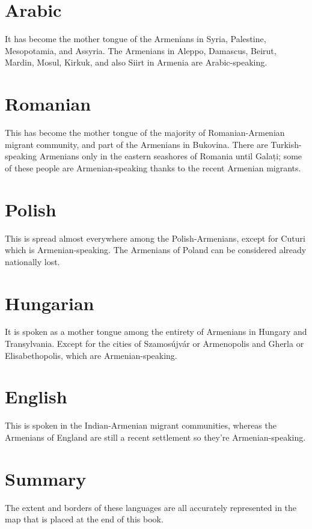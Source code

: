 \section{Arabic}\label{sec:Langauges:Arabic}

It has become the mother tongue of the Armenians in Syria, Palestine, Mesopotamia, and Assyria. The Armenians in Aleppo, Damascus, Beirut, Mardin, Mosul, Kirkuk, and also Siirt in Armenia are Arabic-speaking. 

\section{Romanian}

This has become the mother tongue of the majority of Romanian-Armenian migrant community, and part of the Armenians in Bukovina. There are Turkish-speaking Armenians only in the eastern seashores of Romania until Galați; some of these people are Armenian-speaking thanks to the recent Armenian migrants. 

\section{Polish}

This is spread almost everywhere among the Polish-Armenians, except for Cuturi which is Armenian-speaking. The Armenians of Poland can be considered already nationally lost.

\section{Hungarian}

It is spoken as a mother tongue among the entirety of Armenians in Hungary and Transylvania. Except for the cities of Szamosújvár or Armenopolis and Gherla or Elisabethopolis, which are Armenian-speaking.


\section{English}

This is spoken in the Indian-Armenian migrant communities, whereas the Armenians of England are still a recent settlement so they're Armenian-speaking. 

\section{Summary}
The extent and borders of these languages are all accurately represented in the map that is placed at the end of this book. 


